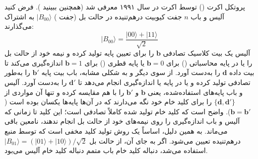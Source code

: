 پروتکل اکرت () توسط اکرت در سال ۱۹۹۱ معرفی شد \cite{39} (همچنین ببینید \cite{7}). فرض کنید آلیس و باب $n$ جفت کیوبیت درهم‌تنیده در حالت بل (جفت ) $|B_{00}\rangle$ به اشتراک می‌گذارند:
\begin{equation}
	|B_{00}\rangle = \frac{|00\rangle + |11\rangle}{\sqrt{2}}
	\label{eq:6-16}
\end{equation}
آلیس یک بیت کلاسیک تصادفی $\bm{b}$ را برای تعیین پایه تولید کرده و نیمه خود از حالت بل را یا در پایه محاسباتی () برای $\bm{b}=0$ یا پایه قطری () برای $\bm{b}=1$ اندازه‌گیری می‌کند تا بیت داده $\bm{d}$ را به‌دست آورد. از سوی دیگر و به شکلی مشابه، باب بیت پایه $\bm{b'}$ را به‌طور تصادفی تولید کرده و یا در پایه  یا  اندازه‌گیری انجام می‌دهد تا $\bm{d'}$ را به‌دست آورد. آلیس و باب پایه‌های استفاده‌شده، یعنی $\bm{b}$ و $\bm{b'}$ را با هم مقایسه کرده و تنها آن مواردی از $\{\bm{d}, \bm{d'}\}$ را برای کلید خام خود نگه می‌دارند که در آن‌ها پایه‌ها یکسان بوده است ($\bm{b} = \bm{b'}$). واضح است که کلید خام تولید شده کاملاً تصادفی است؛ این کلید تا زمانی که آلیس و باب اندازه‌گیری را روی نیمه‌های خود از حالت بل انجام ندهند، نامعین باقی می‌ماند. به همین دلیل،  اساساً یک روش تولید کلید مخفی است که توسط منبع درهم‌تنیده تعیین می‌شود. اگر به جای آن، از حالت بل $|B_{01}\rangle = (|01\rangle + |10\rangle)/\sqrt{2}$ استفاده می‌شد، دنباله کلید خام باب متمم دنباله کلید خام آلیس می‌بود.



